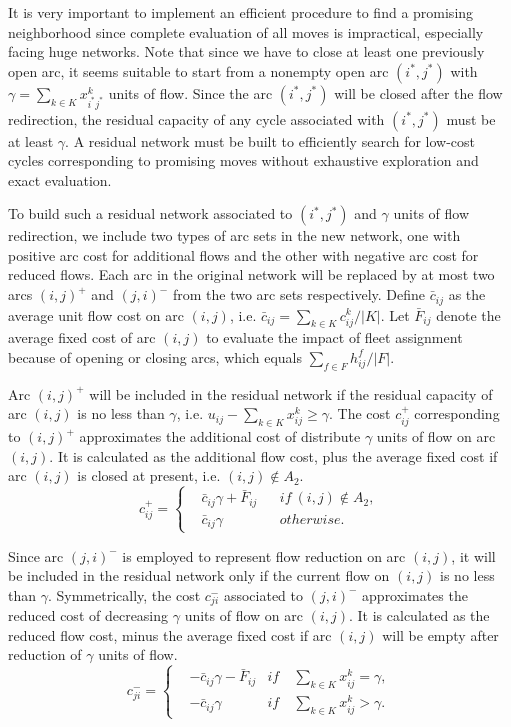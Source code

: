 \documentclass[11pt,nonblindrev,fleqn]{article}
\begin{document}
It is very important to implement an efficient procedure to find a promising neighborhood since complete evaluation of all moves is impractical, especially facing huge networks. Note that since we have to close at least one previously open arc, it seems suitable to start from a nonempty open arc $(i^*,j^*)$ with $\gamma = \sum_{k\in K} x_{i^*j^*}^k$ units of flow. Since the arc $(i^*,j^*)$ will be closed after the flow redirection, the residual capacity of any cycle associated with $(i^*,j^*)$ must be at least $\gamma$. A residual network must be built to efficiently search for low-cost cycles corresponding to promising moves without exhaustive exploration and exact evaluation.

To build such a residual network associated to $(i^*,j^*)$ and $\gamma$ units of flow redirection, we include two types of arc sets in the new network, one with positive arc cost for additional flows and the other with negative arc cost for reduced flows. Each arc in the original network will be replaced by at most two arcs $(i,j)^+$ and $(j,i)^-$ from the two arc sets respectively. Define $\bar{c}_{ij}$ as the average unit flow cost on arc $(i,j)$, i.e. $\bar{c}_{ij} = \sum_{k\in K} c_{ij}^k / |K|$. Let $\bar{F}_{ij}$ denote the average fixed cost of arc $(i,j)$ to evaluate the impact of fleet assignment because of opening or closing arcs, which equals $\sum_{f\in F}h_{ij}^f/ |F|$.

Arc $(i,j)^+$ will be included in the residual network if the residual capacity of arc $(i,j)$ is no less than $\gamma$, i.e. $ u_{ij} - \sum_{k\in K} x_{ij}^k \geq \gamma$. The cost $c_{ij}^+$ corresponding to $(i,j)^+$ approximates the additional cost of distribute $\gamma$ units of flow on arc $(i,j)$. It is calculated as the additional flow cost, plus the average fixed cost if arc $(i,j)$ is closed at present, i.e. $(i,j) \notin A_2$.
\begin{equation*}
c_{ij}^+ = \left\{
\begin{aligned}
&\bar{c}_{ij} \gamma + \bar{F}_{ij}  & & if\ (i,j) \notin A_2, \\
&\bar{c}_{ij} \gamma                 & & otherwise.
\end{aligned}
\right.
\end{equation*}

Since arc $(j,i)^-$ is employed to represent flow reduction on arc $(i,j)$, it will be included in the residual network only if the current flow on $(i,j)$ is no less than $\gamma$. Symmetrically, the cost $c_{ji}^-$ associated to $(j,i)^-$ approximates the reduced cost of decreasing $\gamma$ units of flow on arc $(i,j)$. It is calculated as the reduced flow cost, minus the average fixed cost if arc $(i,j)$ will be empty after reduction of $\gamma$ units of flow.
\begin{equation*}
c_{ji}^- = \left\{
\begin{aligned}
&-\bar{c}_{ij} \gamma - \bar{F}_{ij}  &if \ & \sum_{k\in K} x_{ij}^k = \gamma, \\
&-\bar{c}_{ij} \gamma                  &if \ &\sum_{k\in K} x_{ij}^k > \gamma.
\end{aligned}
\right.
\end{equation*}
\end{document}
